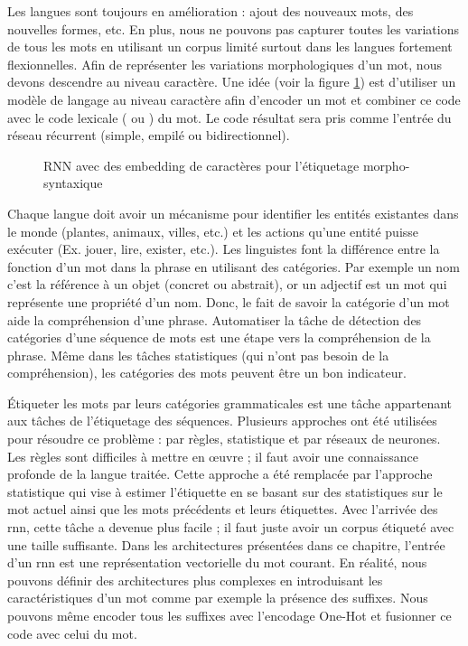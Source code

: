 \documentclass{KodeBook}
\begin{document}
Les langues sont toujours en amélioration : ajout des nouveaux mots, des nouvelles formes, etc. 
En plus, nous ne pouvons pas capturer toutes les variations de tous les mots en utilisant un corpus limité surtout dans les langues fortement flexionnelles. 
Afin de représenter les variations morphologiques d'un mot, nous devons descendre au niveau caractère.
Une idée (voir la figure \ref{fig:pos-rnn4}) est d'utiliser un modèle de langage au niveau caractère afin d'encoder un mot et combiner ce code avec le code lexicale ( ou ) du mot. 
Le code résultat sera pris comme l'entrée du réseau récurrent (simple, empilé ou bidirectionnel).
\begin{figure}[ht]
	\centering
	\caption[Embedding de caractères pour l'étiquetage morpho-syntaxique]{RNN avec des embedding de caractères pour l'étiquetage morpho-syntaxique \cite{2019-jurafsky-martin}\label{fig:pos-rnn4}}
\end{figure}

Chaque langue doit avoir un mécanisme pour identifier les entités existantes dans le monde (plantes, animaux, villes, etc.) et les actions qu'une entité puisse exécuter (Ex. jouer, lire, exister, etc.). 
Les linguistes font la différence entre la fonction d'un mot dans la phrase en utilisant des catégories. 
Par exemple un nom c'est la référence à un objet (concret ou abstrait), or un adjectif est un mot qui représente une propriété d'un nom. 
Donc, le fait de savoir la catégorie d'un mot aide la compréhension d'une phrase. 
Automatiser la tâche de détection des catégories d'une séquence de mots est une étape vers la compréhension de la phrase. 
Même dans les tâches statistiques (qui n'ont pas besoin de la compréhension), les catégories des mots peuvent être un bon indicateur. 

Étiqueter les mots par leurs catégories grammaticales est une tâche appartenant aux tâches de l'étiquetage des séquences. 
Plusieurs approches ont été utilisées pour résoudre ce problème : par règles, statistique et par réseaux de neurones. 
Les règles sont difficiles à mettre en œuvre ; il faut avoir une connaissance profonde de la langue traitée.
Cette approche a été remplacée par l'approche statistique qui vise à estimer l'étiquette en se basant sur des statistiques sur le mot actuel ainsi que les mots précédents et leurs étiquettes.
Avec l'arrivée des \ac{rnn}, cette tâche a devenue plus facile ; il faut juste avoir un corpus étiqueté avec une taille suffisante. 
Dans les architectures présentées dans ce chapitre, l'entrée d'un \ac{rnn} est une représentation vectorielle du mot courant. 
En réalité, nous pouvons définir des architectures plus complexes en introduisant les caractéristiques d'un mot comme par exemple la présence des suffixes. 
Nous pouvons même encoder tous les suffixes avec l'encodage One-Hot et fusionner ce code avec celui du mot. 
\end{document}
